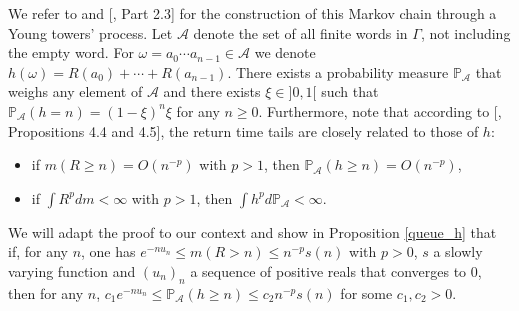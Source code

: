 \documentclass{ws-sd}
\newcommand{\Proba}{\mathbb{P}}
\begin{document}
We refer to \cite{19} and [, Part 2.3] for the construction of this Markov chain through a Young towers' process.
Let $\mathcal A$ denote the set of all finite words in $\Gamma$, not including the empty word. For $\omega = a_0 \cdots a_{n-1} \in \mathcal A$ we denote $h(\omega) = R(a_0) + \cdots + R(a_{n-1})$.
There exists a probability measure $\Proba_{\mathcal A}$ that weighs any element of $\mathcal A$ and there exists $\xi \in ]0,1[$ such that $\Proba_{\mathcal A}(h = n) = (1- \xi)^n \xi$ for any $n \ge 0$. Furthermore, note that according to [, Propositions 4.4 and  4.5], the return time tails are closely related to those of $h$:
\begin{itemize}
    \item if $m(R \ge n) = O(n^{-p})$ with $p > 1$, then $ \Proba_{\mathcal A}(h \ge n) = O(n^{-p})$,
    \item if $\int R^p dm < \infty$ with $p > 1$, then $\int h^p d\Proba_{\mathcal A} < \infty$.
\end{itemize}
We will adapt the proof to our context and show in Proposition \ref{queue_h}  that if, for any $n$, one has $e^{-nu_n} \le m(R > n) \le n^{-p}s(n)$ with $p > 0$, $s$ a slowly varying function and $(u_n)_n$ a sequence of positive reals that converges to 0, then for any $n$, $
        c_1 e^{-nu_n} \le \Proba_{\mathcal A}(h \ge n) \le c_2 n^{-p}s(n)
    \label{link_h_R_extended}$
for some $c_1, c_2 >0$.
\end{document}
